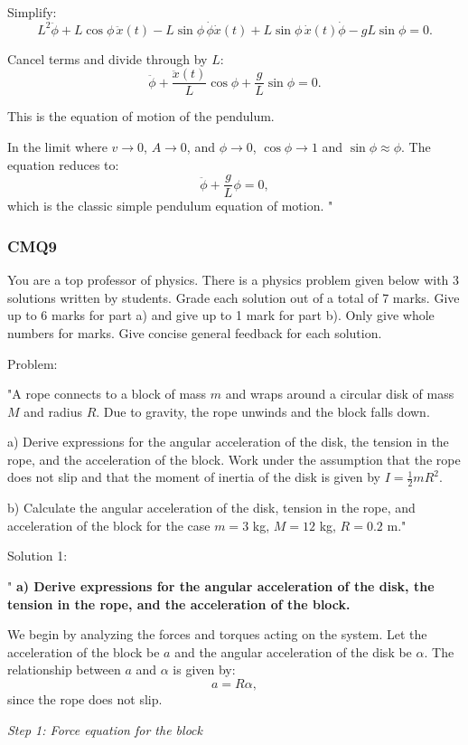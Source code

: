 Simplify:
\[
L^2\ddot{\phi} + L\cos\phi \, \ddot{x}(t) - L\sin\phi \, \dot{\phi}\dot{x}(t) + L\sin\phi \, \dot{x}(t)\dot{\phi} - gL\sin\phi = 0.
\]

Cancel terms and divide through by $L$:
\[
\ddot{\phi} + \frac{\ddot{x}(t)}{L}\cos\phi + \frac{g}{L}\sin\phi = 0.
\]

This is the equation of motion of the pendulum.

In the limit where $v \to 0$, $A \to 0$, and $\phi \to 0$, $\cos\phi \to 1$ and $\sin\phi \approx \phi$. The equation reduces to:
\[
\ddot{\phi} + \frac{g}{L}\phi = 0,
\]
which is the classic simple pendulum equation of motion.
"

\subsubsection{CMQ9}

You are a top professor of physics. There is a physics problem given below with 3 solutions written by students. Grade each solution out of a total of 7 marks. Give up to 6 marks for part a) and give up to 1 mark for part b). Only give whole numbers for marks. Give concise general feedback for each solution.

Problem:

"A rope connects to a block of mass \( m \) and wraps around a circular disk of mass \( M \) and radius \( R \). Due to gravity, the rope unwinds and the block falls down. 

a) Derive expressions for the angular acceleration of the disk, the tension in the rope, and the acceleration of the block. Work under the assumption that the rope does not slip and that the moment of inertia of the disk is given by \( I = \frac{1}{2} m R^{2} \).
    
b) Calculate the angular acceleration of the disk, tension in the rope, and acceleration of the block for the case \( m = 3 \) kg, \( M = 12 \) kg, \( R = 0.2 \) m."

Solution 1: 

"
\textbf{a) Derive expressions for the angular acceleration of the disk, the tension in the rope, and the acceleration of the block.}

We begin by analyzing the forces and torques acting on the system. Let the acceleration of the block be $a$ and the angular acceleration of the disk be $\alpha$. The relationship between $a$ and $\alpha$ is given by:
\[
a = R\alpha,
\]
since the rope does not slip.

\textit{Step 1: Force equation for the block}

